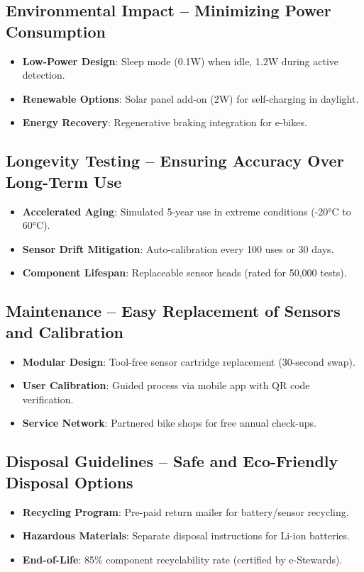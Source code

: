 \documentclass{article}
\begin{document}
\subsection{Environmental Impact -- Minimizing Power Consumption}
\begin{itemize}
    \item \textbf{Low-Power Design}: Sleep mode (0.1W) when idle, 1.2W during active detection.
    \item \textbf{Renewable Options}: Solar panel add-on (2W) for self-charging in daylight.
    \item \textbf{Energy Recovery}: Regenerative braking integration for e-bikes.
\end{itemize}

\subsection{Longevity Testing -- Ensuring Accuracy Over Long-Term Use}
\begin{itemize}
    \item \textbf{Accelerated Aging}: Simulated 5-year use in extreme conditions (-20°C to 60°C).
    \item \textbf{Sensor Drift Mitigation}: Auto-calibration every 100 uses or 30 days.
    \item \textbf{Component Lifespan}: Replaceable sensor heads (rated for 50,000 tests).
\end{itemize}

\subsection{Maintenance -- Easy Replacement of Sensors and Calibration}
\begin{itemize}
    \item \textbf{Modular Design}: Tool-free sensor cartridge replacement (30-second swap).
    \item \textbf{User Calibration}: Guided process via mobile app with QR code verification.
    \item \textbf{Service Network}: Partnered bike shops for free annual check-ups.
\end{itemize}

\subsection{Disposal Guidelines -- Safe and Eco-Friendly Disposal Options}
\begin{itemize}
    \item \textbf{Recycling Program}: Pre-paid return mailer for battery/sensor recycling.
    \item \textbf{Hazardous Materials}: Separate disposal instructions for Li-ion batteries.
    \item \textbf{End-of-Life}: 85\% component recyclability rate (certified by e-Stewards).
\end{itemize}
\end{document}
